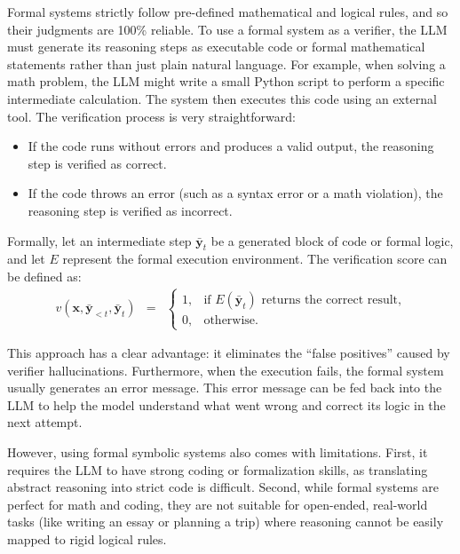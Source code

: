 Formal systems strictly follow pre-defined mathematical and logical rules, and so their judgments are 100\% reliable. To use a formal system as a verifier, the LLM must generate its reasoning steps as executable code or formal mathematical statements rather than just plain natural language. For example, when solving a math problem, the LLM might write a small Python script to perform a specific intermediate calculation. The system then executes this code using an external tool. The verification process is very straightforward:

\begin{itemize}
\item \vspace{0.5em} If the code runs without errors and produces a valid output, the reasoning step is verified as correct.
\item \vspace{0.3em} If the code throws an error (such as a syntax error or a math violation), the reasoning step is verified as incorrect.
\end{itemize}
\vspace{0.5em}

Formally, let an intermediate step $\bar{\mathbf{y}}_t$ be a generated block of code or formal logic, and let $E$ represent the formal execution environment. The verification score can be defined as:
\begin{eqnarray}
v(\mathbf{x}, \bar{\mathbf{y}}_{<t}, \bar{\mathbf{y}}_t) & = & \begin{cases}
1, & \text{if } E(\bar{\mathbf{y}}_t) \text{  returns the correct result,} \\
0, & \text{otherwise.}
\end{cases}
\end{eqnarray}


This approach has a clear advantage: it eliminates the ``false positives'' caused by verifier hallucinations. Furthermore, when the execution fails, the formal system usually generates an error message. This error message can be fed back into the LLM to help the model understand what went wrong and correct its logic in the next attempt.

However, using formal symbolic systems also comes with limitations. First, it requires the LLM to have strong coding or formalization skills, as translating abstract reasoning into strict code is difficult. Second, while formal systems are perfect for math and coding, they are not suitable for open-ended, real-world tasks (like writing an essay or planning a trip) where reasoning cannot be easily mapped to rigid logical rules.

